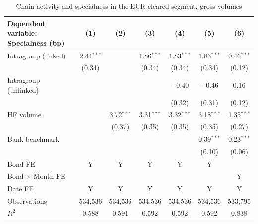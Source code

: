 \documentclass[english, 11pt, oneside, legal]{article}
\begin{document}
\begin{table}[htbp]
    \centering
    \caption{Chain activity and specialness in the EUR cleared segment, gross volumes}
    \label{tab:specialness_gross}
    \begin{tabular}{lcccccc}
        \hline
        Dependent variable: Specialness (bp) & (1) & (2) & (3) & (4) & (5) & (6) \\
        \hline
        Intragroup (linked)    & 2.44$^{***}$ &              & 1.86$^{***}$ & 1.83$^{***}$ & 1.83$^{***}$ & 0.46$^{***}$ \\
                               & (0.34)       &              & (0.34)       & (0.34)       & (0.34)       & (0.12)       \\
        Intragroup (unlinked)  &              &              &              & $-0.40$      & $-0.46$      & 0.16         \\
                               &              &              &              & (0.32)       & (0.31)       & (0.12)       \\
        HF volume              &              & 3.72$^{***}$ & 3.31$^{***}$ & 3.32$^{***}$ & 3.18$^{***}$ & 1.35$^{***}$ \\
                               &              & (0.37)       & (0.35)       & (0.35)       & (0.35)       & (0.27)       \\
        Bank benchmark         &              &              &              &              & 0.39$^{***}$ & 0.23$^{***}$ \\
                               &              &              &              &              & (0.10)       & (0.06)       \\
        \hline
        Bond FE                & Y            & Y            & Y            & Y            & Y            &              \\
        Bond $\times$ Month FE &              &              &              &              &              & Y            \\
        Date FE                & Y            & Y            & Y            & Y            & Y            & Y            \\
        Observations           & 534{,}536    & 534{,}536    & 534{,}536    & 534{,}536    & 534{,}536    & 533{,}795    \\
        $R^{2}$                & 0.588        & 0.591        & 0.592        & 0.592        & 0.592        & 0.838        \\
        \hline
    \end{tabular}

\end{table}
\end{document}
